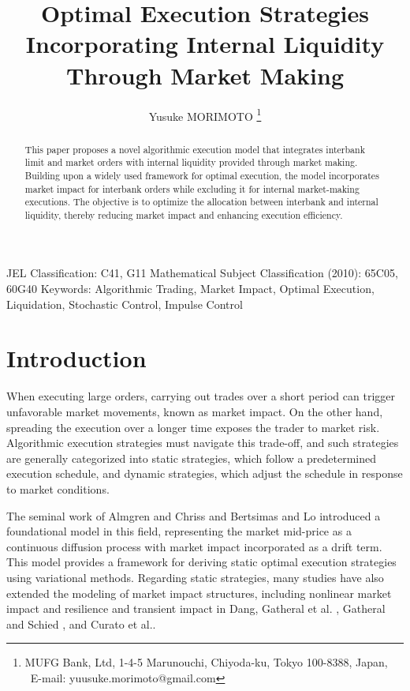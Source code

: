 \documentclass[12pt]{article}
\begin{document}
\title{Optimal Execution Strategies Incorporating Internal Liquidity Through Market Making}

\author{
Yusuke MORIMOTO
\thanks{
MUFG Bank, Ltd, 1-4-5 Marunouchi, Chiyoda-ku, Tokyo 100-8388, Japan, \
E-mail: yuusuke.morimoto@gmail.com} }
\date{}
\maketitle
\begin{abstract}
This paper proposes a novel algorithmic execution model that integrates interbank limit and market orders with internal liquidity provided through market making. 
Building upon a widely used framework for optimal execution, the model incorporates market impact for interbank orders while excluding it for internal market-making executions. The objective is to optimize the allocation between interbank and internal liquidity, thereby reducing market impact and enhancing execution efficiency.
\end{abstract}

JEL Classification: C41, G11
Mathematical Subject Classification (2010): 65C05, 60G40
Keywords: Algorithmic Trading, Market Impact, Optimal Execution, Liquidation, Stochastic Control, Impulse Control

\section{Introduction}
When executing large orders, carrying out trades over a short period can trigger unfavorable market movements, known as market impact. 
On the other hand, spreading the execution over a longer time exposes the trader to market risk. 
Algorithmic execution strategies must navigate this trade-off, 
and such strategies are generally categorized into static strategies, 
which follow a predetermined execution schedule, and dynamic strategies, 
which adjust the schedule in response to market conditions.

The seminal work of Almgren and Chriss \cite{almgren2001optimal} and Bertsimas and Lo \cite{bertsimas1998optimal} introduced a foundational model in this field, 
representing the market mid-price as a continuous diffusion process with market impact 
incorporated as a drift term. This model provides a framework for deriving static optimal execution strategies using variational methods.
Regarding static strategies, many studies have also extended the modeling of market impact structures, 
including nonlinear market impact and resilience and transient impact in Dang\cite{dang2017optimal}, Gatheral et al. \cite{gatheral2011exponential}, Gatheral and Schied \cite{gatheral2012transient}, and Curato et al.\cite{curato2017optimal}.
\end{document}
